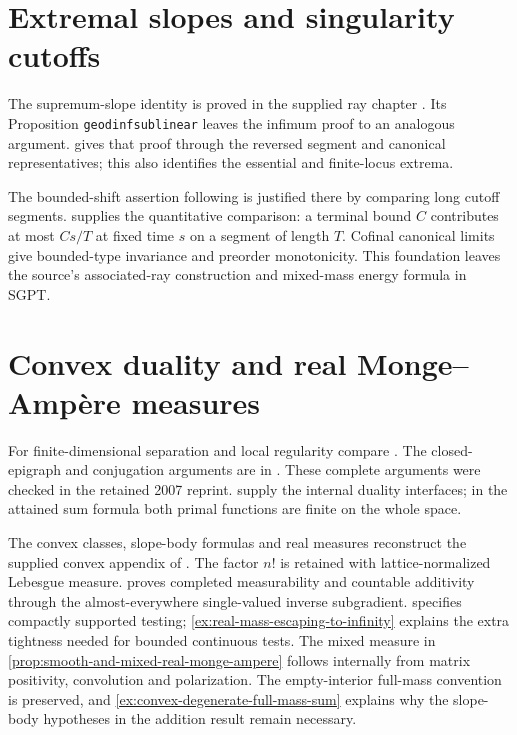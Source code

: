 \section{Extremal slopes and singularity cutoffs}\label{sec:history-geodesic-rays}
The supremum-slope identity is proved in the supplied ray chapter \cite[Proposition \texttt{geodsupsublinear}]{XiaSampleBook}. Its Proposition \texttt{geodinfsublinear} leaves the infimum proof to an analogous argument.  gives that proof through the reversed segment and canonical representatives; this also identifies the essential and finite-locus extrema.

The bounded-shift assertion following \cite[Example \texttt{rayasspsh}]{XiaSampleBook} is justified there by comparing long cutoff segments.  supplies the quantitative comparison: a terminal bound $C$ contributes at most $Cs/T$ at fixed time $s$ on a segment of length $T$. Cofinal canonical limits give bounded-type invariance and preorder monotonicity. This foundation leaves the source's associated-ray construction and mixed-mass energy formula in SGPT.

\section{Convex duality and real Monge--Amp\`ere measures}
\label{sec:history-convex-measures}
For finite-dimensional separation and local regularity compare \cite[Theorem 2.1.10 and Corollaries 2.1.11--2.1.13, pp.~44--45; Theorem 2.1.22, pp.~55--56]{Hor07}. The closed-epigraph and conjugation arguments are in \cite[Propositions 2.2.1--2.2.2 and Theorem 2.2.4, pp.~66--68; Theorem 2.2.5, pp.~68--69; Theorem 2.2.8, p.~70]{Hor07}. These complete arguments were checked in the retained 2007 reprint.  supply the internal duality interfaces; in the attained sum formula both primal functions are finite on the whole space.

The convex classes, slope-body formulas and real measures reconstruct the supplied convex appendix of \cite{XiaSampleBook}. The factor $n!$ is retained with lattice-normalized Lebesgue measure.  proves completed measurability and countable additivity through the almost-everywhere single-valued inverse subgradient.  specifies compactly supported testing; \cref{ex:real-mass-escaping-to-infinity} explains the extra tightness needed for bounded continuous tests. The mixed measure in \cref{prop:smooth-and-mixed-real-monge-ampere} follows internally from matrix positivity, convolution and polarization. The empty-interior full-mass convention is preserved, and \cref{ex:convex-degenerate-full-mass-sum} explains why the slope-body hypotheses in the addition result remain necessary.


